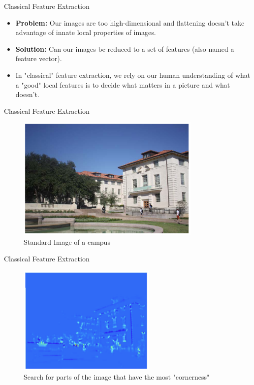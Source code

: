 \begin{frame}{Classical Feature Extraction}
\begin{itemize}
    \item \textbf{Problem:} Our images are too high-dimensional and flattening doesn't take advantage of innate local properties of images.
    \item \textbf{Solution:} Can our images be reduced to a set of features (also named a feature vector).
    \item In "classical" feature extraction, we rely on our human understanding of what a "good" local features is to decide what matters in a picture and what doesn't.
\end{itemize}
\end{frame}

\begin{frame}{Classical Feature Extraction}
    \begin{figure}
    \centering
    \includegraphics[width=0.8\textwidth]{img/house.png}
    \caption{Standard Image of a campus}
    \end{figure}
\end{frame}

\begin{frame}{Classical Feature Extraction}
    \begin{figure}
    \centering
    \includegraphics[width=0.6\textwidth]{img/cornernessheatmap.png}
    \caption{Search for parts of the image that have the most "cornerness"}
    \end{figure}
\end{frame}

